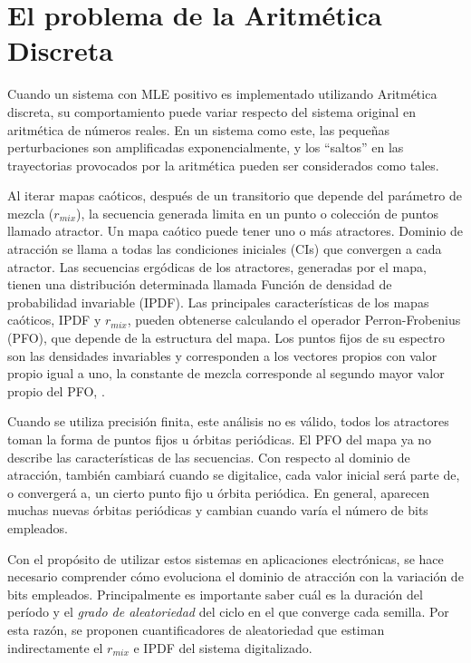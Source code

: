 \section{El problema de la Aritmética Discreta}

Cuando un sistema con MLE positivo es implementado utilizando Aritmética discreta, su comportamiento puede variar respecto del sistema original en aritmética de números reales. En un sistema como este, las pequeñas perturbaciones son amplificadas exponencialmente, y los ``saltos'' en las trayectorias provocados por la aritmética pueden ser considerados como tales.

Al iterar mapas caóticos, después de un transitorio que depende del parámetro de mezcla ($r_{mix}$), la secuencia generada limita en un punto o colección de puntos llamado atractor.
Un mapa caótico puede tener uno o más atractores.
Dominio de atracción se llama a todas las condiciones iniciales (CIs) que convergen a cada atractor.
Las secuencias ergódicas de los atractores, generadas por el mapa, tienen una distribución determinada llamada Función de densidad de probabilidad invariable (IPDF).
Las principales características de los mapas caóticos, IPDF y $r_{mix}$, pueden obtenerse calculando el operador Perron-Frobenius (PFO), que depende de la estructura del mapa.
Los puntos fijos de su espectro son las densidades invariables y corresponden a los vectores propios con valor propio igual a uno, la constante de mezcla corresponde al segundo mayor valor propio del PFO, \cite{Lasota1994, Lasota1973}.

Cuando se utiliza precisión finita, este análisis no es válido, todos los atractores toman la forma de puntos fijos u órbitas periódicas.
El PFO del mapa ya no describe las características de las secuencias.
Con respecto al dominio de atracción, también cambiará cuando se digitalice, cada valor inicial será parte de, o convergerá a, un cierto punto fijo u órbita periódica.
En general, aparecen muchas nuevas órbitas periódicas y cambian cuando varía el número de bits empleados.

Con el propósito de utilizar estos sistemas en aplicaciones electrónicas, se hace necesario comprender cómo evoluciona el dominio de atracción con la variación de bits empleados.
Principalmente es importante saber cuál es la duración del período y el \textsl{grado de aleatoriedad} del ciclo en el que converge cada semilla.
Por esta razón, se proponen cuantificadores de aleatoriedad que estiman indirectamente el $r_{mix}$ e IPDF del sistema digitalizado.